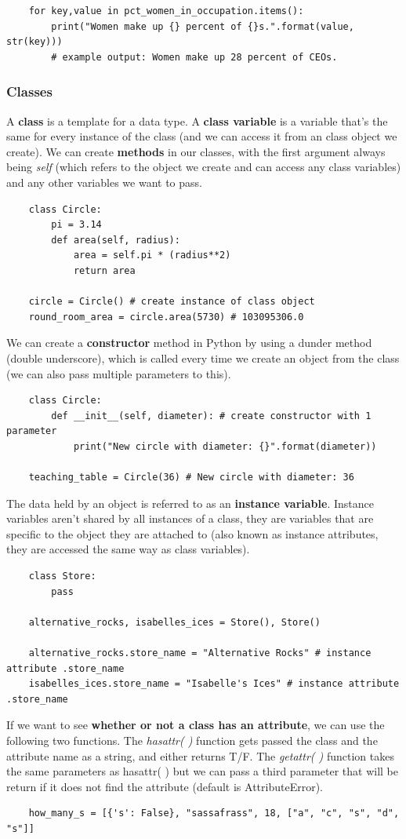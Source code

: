 \documentclass[11pt, a4paper]{article}
\begin{document}
\begin{spacing}{1.1}
\begin{lstlisting}
	for key,value in pct_women_in_occupation.items():
		print("Women make up {} percent of {}s.".format(value, str(key)))
		# example output: Women make up 28 percent of CEOs. \end{lstlisting} \vspace*{4mm}
	
	\subsubsection{Classes}
	A \textbf{class} is a template for a data type. A \textbf{class variable} is a variable that’s the same for every instance of the class (and we can access it from an class object we create). We can create \textbf{methods} in our classes, with the first argument always being \textit{self} (which refers to the object we create and can access any class variables) and any other variables we want to pass.
	\begin{lstlisting}
	class Circle:
		pi = 3.14
		def area(self, radius):
			area = self.pi * (radius**2)
			return area
	
	circle = Circle() # create instance of class object
	round_room_area = circle.area(5730) # 103095306.0 \end{lstlisting}\vspace*{1mm}
	We can create a \textbf{constructor} method in Python by using a dunder method (double underscore), which is called every time we create an object from the class (we can also pass multiple parameters to this). 
	\begin{lstlisting}
	class Circle:
		def __init__(self, diameter): # create constructor with 1 parameter
			print("New circle with diameter: {}".format(diameter))
	
	teaching_table = Circle(36) # New circle with diameter: 36	\end{lstlisting}\vspace*{1mm}
	The data held by an object is referred to as an \textbf{instance variable}. Instance variables aren't shared by all instances of a class, they are variables that are specific to the object they are attached to (also known as instance attributes, they are accessed the same way as class variables).
	\begin{lstlisting}
	class Store:
		pass
	
	alternative_rocks, isabelles_ices = Store(), Store()
	
	alternative_rocks.store_name = "Alternative Rocks" # instance attribute .store_name
	isabelles_ices.store_name = "Isabelle's Ices" # instance attribute .store_name \end{lstlisting} \newpage
	\noindent If we want to see \textbf{whether or not a class has an attribute}, we can use the following two functions. The \textit{hasattr( )} function gets passed the class and the attribute name as a string, and either returns T/F. The \textit{getattr( )} function takes the same parameters as hasattr( ) but we can pass a third parameter that will be return if it does not find the attribute (default is AttributeError).
	\begin{lstlisting}
	how_many_s = [{'s': False}, "sassafrass", 18, ["a", "c", "s", "d", "s"]]
	

\end{lstlisting}
\end{spacing}
\end{document}
